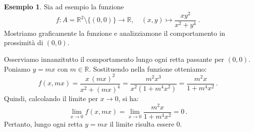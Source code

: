 \documentclass{article}
\theoremstyle{plain}
\theoremstyle{definition}
\newtheorem{exmp}{Esempio}[section]
\theoremstyle{remark}
\begin{document}
\vspace{10pt}

\begin{exmp}
    Sia ad esempio la funzione
    \[
    f\colon A=\mathbb{R}^2\setminus\{(0,0)\}\to\mathbb{R},\quad (x,y)\mapsto \frac{xy^2}{x^2+y^4}~.
    \]
    Mostriamo graficamente la funzione e analizziamone il comportamento in prossimità di \((0,0)\).

    \begin{center}
        \hspace{1cm}
    \end{center}

    Osserviamo innanzitutto il comportamento lungo ogni retta passante per \((0,0)\). Poniamo \(y=mx\) con \(m\in\mathbb{R}\). Sostituendo nella funzione otteniamo:
    \[
    f(x,mx)=\frac{x\,(mx)^2}{x^2+(mx)^4}=\frac{m^2 x^3}{x^2(1+m^4 x^2)}=\frac{m^2 x}{1+m^4 x^2}\,.
    \]
    Quindi, calcolando il limite per \(x\to0\), si ha:
    \[
    \lim_{x\to0} f(x,mx)=\lim_{x\to0}\frac{m^2 x}{1+m^4 x^2}=0\,.
    \]
    Pertanto, lungo ogni retta \(y=mx\) il limite risulta essere \(0\).


\end{exmp}
\end{document}
